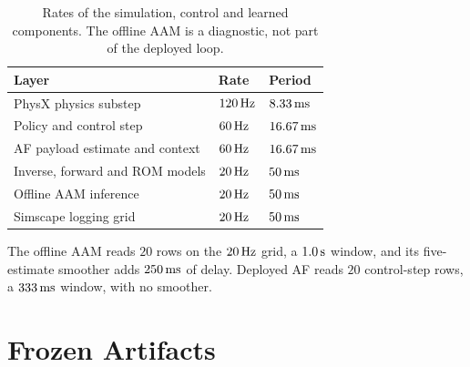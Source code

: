\begin{table}[H]
  \centering
  \caption{Rates of the simulation, control and learned components. The offline
  AAM is a diagnostic, not part of the deployed loop.}
  \label{tab:app:rates}
  \small
  \begin{tabular}{lll}
    \toprule
    Layer & Rate & Period \\
    \midrule
    PhysX physics substep           & $\unit[120]{Hz}$ & $\unit[8.33]{ms}$ \\
    Policy and control step         & $\unit[60]{Hz}$  & $\unit[16.67]{ms}$ \\
    AF payload estimate and context & $\unit[60]{Hz}$  & $\unit[16.67]{ms}$ \\
    Inverse, forward and ROM models & $\unit[20]{Hz}$  & $\unit[50]{ms}$ \\
    Offline AAM inference           & $\unit[20]{Hz}$  & $\unit[50]{ms}$ \\
    Simscape logging grid           & $\unit[20]{Hz}$  & $\unit[50]{ms}$ \\
    \bottomrule
  \end{tabular}
\end{table}

The offline AAM reads $20$ rows on the $\unit[20]{Hz}$ grid, a $\unit[1.0]{s}$
window, and its five-estimate smoother adds $\unit[250]{ms}$ of delay. Deployed
AF reads $20$ control-step rows, a $\unit[333]{ms}$ window, with no smoother.

\section{Frozen Artifacts}

